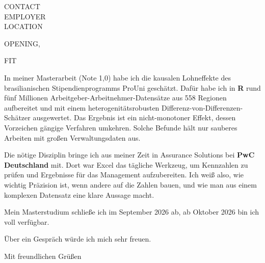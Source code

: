 \documentclass[a4paper,11pt,version=last]{scrlttr2}
\begin{document}
\begin{letter}{%
    {{CONTACT}} \\
    {{EMPLOYER}} \\
    {{LOCATION}}
}

\opening{{{OPENING}},}

%

{{FIT}}

In meiner Masterarbeit (Note 1,0) habe ich die kausalen Lohneffekte des brasilianischen Stipendienprogramms ProUni gesch\"atzt. Daf\"ur habe ich in \textbf{R} rund f\"unf Millionen Arbeitgeber-Arbeitnehmer-Datens\"atze aus 558 Regionen aufbereitet und mit einem heterogenit\"atsrobusten Differenz-von-Differenzen-Sch\"atzer ausgewertet. Das Ergebnis ist ein nicht-monotoner Effekt, dessen Vorzeichen g\"angige Verfahren umkehren. Solche Befunde h\"alt nur sauberes Arbeiten mit gro\ss{}en Verwaltungsdaten aus.

Die n\"otige Disziplin bringe ich aus meiner Zeit in Assurance Solutions bei \textbf{PwC Deutschland} mit. Dort war Excel das t\"agliche Werkzeug, um Kennzahlen zu pr\"ufen und Ergebnisse f\"ur das Management aufzubereiten. Ich wei\ss{} also, wie wichtig Pr\"azision ist, wenn andere auf die Zahlen bauen, und wie man aus einem komplexen Datensatz eine klare Aussage macht.

Mein Masterstudium schlie\ss{}e ich im September 2026 ab, ab Oktober 2026 bin ich voll verf\"ugbar.

\"Uber ein Gespr\"ach w\"urde ich mich sehr freuen.

\closing{Mit freundlichen Gr\"u\ss{}en}

\end{letter}
\end{document}
